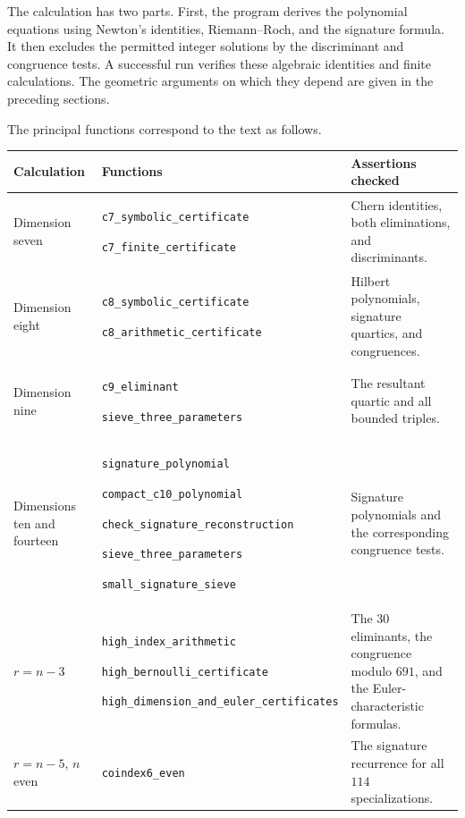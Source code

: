\documentclass[11pt,reqno,letterpaper]{amsart}
\theoremstyle{definition}
\numberwithin{equation}{section}
\begin{document}
The calculation has two parts. First, the program derives the
polynomial equations using Newton's identities, Riemann--Roch, and
the signature formula. It then excludes the permitted integer
solutions by the discriminant and congruence tests. A successful run
verifies these algebraic identities and finite calculations.
The geometric arguments on which they depend are given in the
preceding sections.

The principal functions correspond to the text as follows.
\begin{center}
\small
\begin{tabular}{@{}>{\raggedright\arraybackslash}p{}>{\raggedright\arraybackslash}p{}>{\raggedright\arraybackslash}p{}@{}}
\toprule
Calculation&Functions&Assertions checked\\
\midrule
Dimension seven&
\nolinkurl{c7_symbolic_certificate}\par
\nolinkurl{c7_finite_certificate}&
Chern identities, both eliminations, and discriminants.\\[4pt]
Dimension eight&
\nolinkurl{c8_symbolic_certificate}\par
\nolinkurl{c8_arithmetic_certificate}&
Hilbert polynomials, signature quartics, and congruences.\\[4pt]
Dimension nine&
\nolinkurl{c9_eliminant}\par
\nolinkurl{sieve_three_parameters}&
The resultant quartic and all bounded triples.\\[4pt]
Dimensions ten and fourteen&
\nolinkurl{signature_polynomial}\par
\nolinkurl{compact_c10_polynomial}\par
\nolinkurl{check_signature_reconstruction}\par
\nolinkurl{sieve_three_parameters}\par
\nolinkurl{small_signature_sieve}&
Signature polynomials and the corresponding congruence tests.\\[4pt]
$r=n-3$&
\nolinkurl{high_index_arithmetic}\par
\nolinkurl{high_bernoulli_certificate}\par
\nolinkurl{high_dimension_and_euler_certificates}&
The $30$ eliminants, the congruence modulo $691$, and the Euler-characteristic formulas.\\[4pt]
$r=n-5$, $n$ even&
\nolinkurl{coindex6_even}&
The signature recurrence for all $114$ specializations.\\
\bottomrule
\end{tabular}
\end{center}
\end{document}
